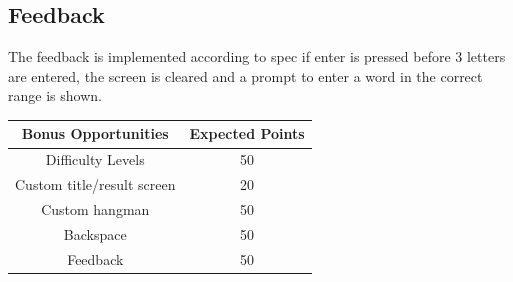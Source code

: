 \documentclass{article}
\begin{document}
\subsection{Feedback}
\begin{center}
    The feedback is implemented according to spec if enter is pressed before 3 letters are entered, the screen is cleared and a prompt to enter a word in the correct range is shown.
\end{center}
\begin{center}
    \begin{tabular}{c|c}
         Bonus Opportunities &  Expected Points\\
         \hline
         Difficulty Levels & 50\\
         Custom title/result screen & 20\\
         Custom hangman & 50\\
         Backspace & 50\\
         Feedback & 50\\
    \end{tabular}
\end{center}
\end{document}
